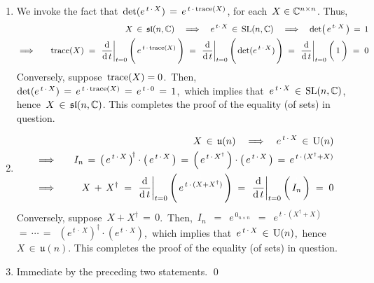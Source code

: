 \begin{enumerate}
\item
	We invoke the fact that \,$\det(e^{\,t\,\cdot\,X}) \,=\, e^{\,t\,\cdot\,\textnormal{trace}(X)}$,
	for each \,$X \in \mathbb{C}^{n \times n}$.
	Thus,
	\begin{eqnarray*}
	&&
		X \,\in\, \mathfrak{sl}(n,\C)
		\quad\Longrightarrow\quad
		e^{\,t\cdot\,X} \,\in\, \textnormal{SL}(n,\C)
		\quad\Longrightarrow\quad
		\det\!\left(\,e^{\,t\cdot\,X}\,\right) \,=\, 1
	\\
	& \Longrightarrow\quad &
		\textnormal{trace}(X)
		\; = \;
			\left.\dfrac{\d}{\d\,t}\right\vert_{t=0}\left(\,\overset{{\color{white}1}}{e^{\,t\,\cdot\,\textnormal{trace}(X)}}\,\right)
		\; = \;
			\left.\dfrac{\d}{\d\,t}\right\vert_{t=0}\left(\,\overset{{\color{white}1}}{\det(e^{\,t\,\cdot\,X})}\,\right)
		\; = \;
			\left.\dfrac{\d}{\d\,t}\right\vert_{t=0}\left(\,\overset{{\color{white}1}}{1}\,\right)
		\; = \;
			0
	\end{eqnarray*}
	Conversely, suppose \,$\textnormal{trace}(X) = 0$.\,
	Then, \,$\det(e^{\,t\,\cdot\,X}) \,=\, e^{\,t\,\cdot\,\textnormal{trace}(X)} \,=\, e^{\,t\,\cdot\,0} \,=\, 1$,\,
	which implies that \,$e^{\,t\,\cdot\,X} \,\in\, \textnormal{SL}(n,\mathbb{C})$,\, hence \,$X \,\in\, \mathfrak{sl}(n,\mathbb{C})$.
	This completes the proof of the equality (of sets) in question.
\item
	\begin{eqnarray*}
	&&
		X \,\in\, \mathfrak{u}(n)
		\quad\Longrightarrow\quad
		e^{\,t\,\cdot\,X} \,\in\, \textnormal{U}(n)
	\\
	& \Longrightarrow\quad &
		I_{n}
			\,=\, \left(\,e^{\,t\,\cdot\,X}\,\right)^{\!\dagger} \cdot \left(\,e^{\,t\,\cdot\,X}\,\right)
			\,=\, \left(\,e^{\,t\,\cdot\,X^{\dagger}}\,\right) \cdot \left(\,e^{\,t\,\cdot\,X}\,\right)
			\,=\, e^{\,t\,\cdot\,(X^{\dagger}+X)}
	\\
	& \Longrightarrow\quad &
		X \,+\, X^{\dagger}
		\; = \;
			\left.\dfrac{\d}{\d\,t}\right\vert_{t=0}\left(\,\overset{{\color{white}1}}{e^{\,t\,\cdot\,(X+X^{\dagger})}}\,\right)
		\; = \;
			\left.\dfrac{\d}{\d\,t}\right\vert_{t=0}\left(\,\overset{{\color{white}1}}{I_{n}}\,\right)
		\; = \;
			0
	\end{eqnarray*}
	Conversely, suppose \,$X + X^{\dagger} \,=\, 0$.\,
	Then, \,$I_{n}$
	\,$=$\, $e^{\,0_{n \times n}}$
	\,$=$\, $e^{\,t\,\cdot(X^{\dagger}+X)}$
	\,$=\, \cdots \,=$\, $\left(e^{\,t\,\cdot\,X}\right)^{\!\dagger}\cdot\left(e^{\,t\,\cdot\,X}\right)$,\,
	which implies that \,$e^{\,t\,\cdot\,X} \,\in\, \textnormal{U}(n)$,\, hence \,$X \,\in\, \mathfrak{u}(n)$.
	This completes the proof of the equality (of sets) in question.
\item
	Immediate by the preceding two statements.
	\qed
\end{enumerate}

